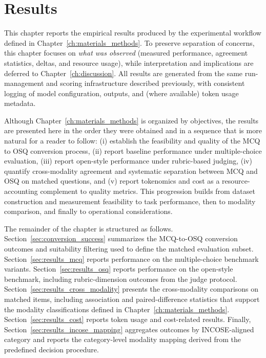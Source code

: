 \chapter{Results}\label{ch:results}

This chapter reports the empirical results produced by the experimental workflow defined in Chapter~\ref{ch:materials_methods}. To preserve separation of concerns, this chapter focuses on \emph{what was observed} (measured performance, agreement statistics, deltas, and resource usage), while interpretation and implications are deferred to Chapter~\ref{ch:discussion}. All results are generated from the same run-management and scoring infrastructure described previously, with consistent logging of model configuration, outputs, and (where available) token usage metadata.

Although Chapter~\ref{ch:materials_methods} is organized by objectives, the results are presented here in the order they were obtained and in a sequence that is more natural for a reader to follow: (i) establish the feasibility and quality of the MCQ to OSQ conversion process, (ii) report baseline performance under multiple-choice evaluation, (iii) report open-style performance under rubric-based judging, (iv) quantify cross-modality agreement and systematic separation between MCQ and OSQ on matched questions, and (v) report tokenomics and cost as a resource-accounting complement to quality metrics. This progression builds from dataset construction and measurement feasibility to task performance, then to modality comparison, and finally to operational considerations.

The remainder of the chapter is structured as follows. Section~\ref{sec:conversion_success} summarizes the MCQ-to-OSQ conversion outcomes and suitability filtering used to define the matched evaluation subset. Section~\ref{sec:results_mcq} reports performance on the multiple-choice benchmark variants. Section~\ref{sec:results_osq} reports performance on the open-style benchmark, including rubric-dimension outcomes from the judge protocol. Section~\ref{sec:results_cross_modality} presents the cross-modality comparisons on matched items, including association and paired-difference statistics that support the modality classifications defined in Chapter~\ref{ch:materials_methods}. Section~\ref{sec:results_cost} reports token usage and cost-related results. Finally, Section~\ref{sec:results_incose_mapping} aggregates outcomes by INCOSE-aligned category and reports the category-level modality mapping derived from the predefined decision procedure.


